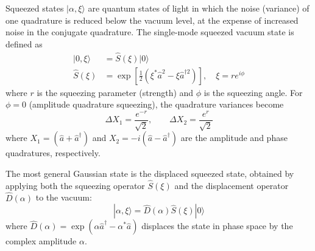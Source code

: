 Squeezed states $|\alpha, \xi\rangle $ are quantum states of light in which the noise (variance) of one quadrature is reduced below the vacuum level, at the expense of increased noise in the conjugate quadrature. The single-mode squeezed vacuum state is defined as
\begin{align}
|0, \xi\rangle &= \hat{S}(\xi) |0\rangle \\
\hat{S}(\xi) &= \exp\left[\frac{1}{2}(\xi^* \hat{a}^2 - \xi \hat{a}^{\dagger 2})\right], \quad \xi = r e^{i\phi}
\end{align}
where $r$ is the squeezing parameter (strength) and $\phi$ is the squeezing angle. For $\phi = 0$ (amplitude quadrature squeezing), the quadrature variances become
\begin{equation}
\Delta X_1 = \frac{e^{-r}}{\sqrt{2}}, \qquad \Delta X_2 = \frac{e^{r}}{\sqrt{2}}
\end{equation}
where $X_1 = (\hat{a} + \hat{a}^\dagger)$ and $X_2 = -i(\hat{a} - \hat{a}^\dagger)$ are the amplitude and phase quadratures, respectively.

The most general Gaussian state is the displaced squeezed state, obtained by applying both the squeezing operator $\hat{S}(\xi)$ and the displacement operator $\hat{D}(\alpha)$ to the vacuum:
\begin{equation}
|\alpha, \xi\rangle = \hat{D}(\alpha)\hat{S}(\xi)|0\rangle
\end{equation}
where $\hat{D}(\alpha) = \exp(\alpha \hat{a}^\dagger - \alpha^* \hat{a})$ displaces the state in phase space by the complex amplitude $\alpha$.

